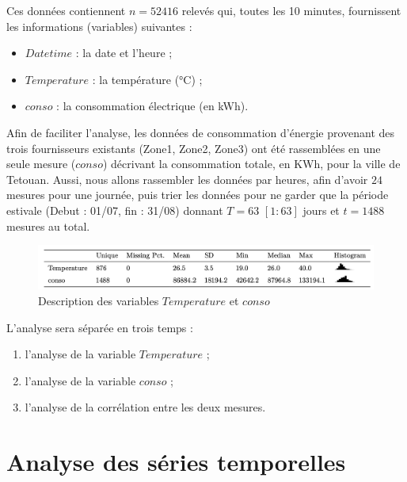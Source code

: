 \documentclass{article}
\theoremstyle{definition}
\theoremstyle{remark}
\begin{document}
Ces données contiennent $n = 52416$ relevés qui, toutes les 10 minutes, fournissent les informations (variables) suivantes : 
\begin{itemize}
    \item $Datetime$ : la date et l'heure ;
    \item $Temperature$ : la température (°C) ;
    \item $conso$ : la consommation électrique (en kWh).
\end{itemize}
Afin de faciliter l'analyse, les données de consommation d'énergie provenant des trois fournisseurs existants (Zone1, Zone2, Zone3) ont été rassemblées en une seule mesure ($conso$) décrivant la consommation totale, en KWh, pour la ville de Tetouan. Aussi, nous allons rassembler les données par heures, afin d'avoir $24$ mesures pour une journée, puis trier les données pour ne garder que la période estivale (Debut : 01/07, fin : 31/08) donnant $T = 63$ $[1:63]$ jours et $t=1488$ mesures au total.
\FloatBarrier
\begin{figure}[!h]
    \centering
    \includegraphics[width=1\linewidth]{fig1.png}
    \caption{Description des variables $Temperature$ et $conso$}
    \label{fig:enter-label}
\end{figure}
L'analyse sera séparée en trois temps : 
\begin{enumerate}
    \item l'analyse de la variable $Temperature$ ;
    \item  l'analyse de la variable $conso$ ;
    \item l'analyse de la corrélation entre les deux mesures.
\end{enumerate}
\newpage
\section{Analyse des séries temporelles}
\end{document}

